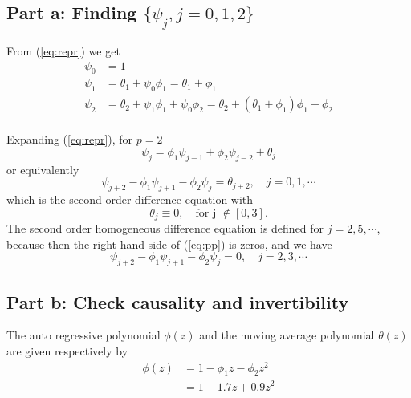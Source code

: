 \documentclass[11pt, oneside]{article}   	%
\begin{document}
\subsection{Part a:  Finding $\{ \psi_{j}, j=0,1,2\}$ }
From (\ref{eq:repr}) we get
\begin{equation}
\begin{aligned}
\psi_{0} &= 1\\
\psi_{1} &= \theta_{1} + \psi_{0}\phi_{1} = \theta_{1} + \phi_{1}\\
\psi_{2} &= \theta_{2} + \psi_{1}\phi_{1} +\psi_{0}\phi_{2} = \theta_{2} + ( \theta_{1} + \phi_{1})\phi_{1}+\phi_{2}\\
\end{aligned}
\end{equation}
\begin{flushleft}
Expanding (\ref{eq:repr}), for $p=2$
\begin{equation}
\psi_{j} = \phi_{1}\psi_{j-1} +\phi_{2}\psi_{j-2} + \theta_{j}
\end{equation}
or equivalently
\begin{equation}\label{eq:pp}
\psi_{j+2} -\phi_{1}\psi_{j+1} -\phi_{2}\psi_{j} = \theta_{j+2},\quad j = 0,1, \cdots
\end{equation}
which is the second order difference equation with 
\begin{equation}
\theta_{j} \equiv 0 ,\quad \text{for j $\not\in[0,3]$}.
\end{equation}
The second order homogeneous difference equation is defined for $j = 2,5,\cdots$, because then the right hand side of (\ref{eq:pp}) is zeros, and we have
\begin{equation}
\psi_{j+2} -\phi_{1}\psi_{j+1} -\phi_{2}\psi_{j} = 0,\quad j = 2,3, \cdots
\end{equation}
\end{flushleft}


\subsection{Part b: Check causality and invertibility}
The auto regressive polynomial $\phi(z)$ and the moving average polynomial $\theta(z)$ are given respectively by
\begin{equation}\label{eq:ar}
\begin{aligned}
\phi(z) &= 1-\phi_{1}z-\phi_{2}z^{2}\\
 &= 1-1.7z+0.9z^{2}
\end{aligned}
\end{equation}
\end{document}
